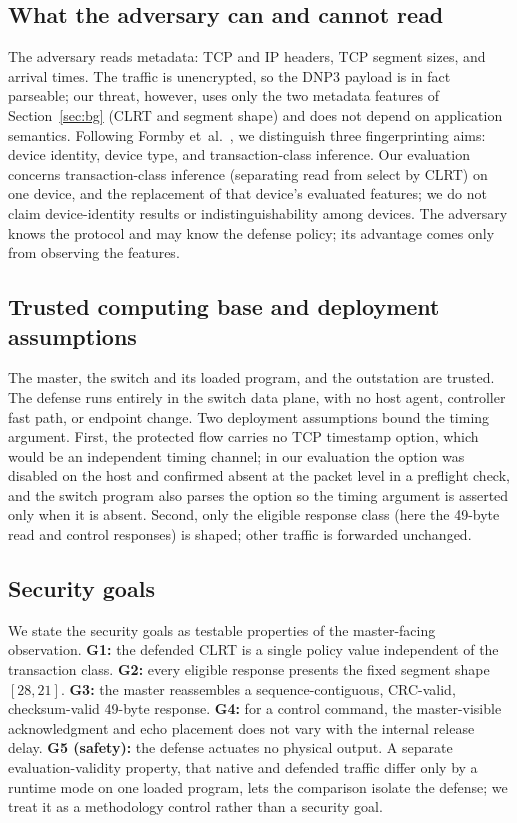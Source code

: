 \documentclass[conference]{IEEEtran}
\begin{document}
\subsection{What the adversary can and cannot read}
The adversary reads metadata: TCP and IP headers, TCP segment sizes, and arrival times. The traffic is
unencrypted, so the DNP3 payload is in fact parseable; our threat, however, uses only the two
metadata features of Section~\ref{sec:bg} (CLRT and segment shape) and does not depend on application
semantics. Following Formby et~al.~\cite{formby2016}, we distinguish three fingerprinting aims: device
identity, device type, and transaction-class inference. Our evaluation concerns transaction-class
inference (separating read from select by CLRT) on one device, and the replacement of that device's
evaluated features; we do not claim device-identity results or indistinguishability among devices. The
adversary knows the protocol and may know the defense policy; its advantage comes only from observing
the features.

\subsection{Trusted computing base and deployment assumptions}
The master, the switch and its loaded program, and the outstation are trusted. The defense runs
entirely in the switch data plane, with no host agent, controller fast path, or endpoint change. Two
deployment assumptions bound the timing argument. First, the protected flow carries no TCP timestamp
option, which would be an independent timing channel; in our evaluation the option was disabled on the
host and confirmed absent at the packet level in a preflight check, and the switch program also parses
the option so the timing argument is asserted only when it is absent. Second, only the eligible
response class (here the 49-byte read and control responses) is shaped; other traffic is forwarded
unchanged.

\subsection{Security goals}
We state the security goals as testable properties of the master-facing observation. \textbf{G1:} the
defended CLRT is a single policy value independent of the transaction class. \textbf{G2:} every
eligible response presents the fixed segment shape $[28,21]$. \textbf{G3:} the master reassembles a
sequence-contiguous, CRC-valid, checksum-valid 49-byte response. \textbf{G4:} for a control command,
the master-visible acknowledgment and echo placement does not vary with the internal release delay.
\textbf{G5 (safety):} the defense actuates no physical output. A separate evaluation-validity
property, that native and defended traffic differ only by a runtime mode on one loaded program, lets
the comparison isolate the defense; we treat it as a methodology control rather than a security goal.
\end{document}
